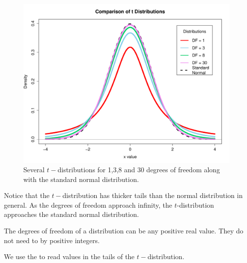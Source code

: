\begin{figure}[H]
\label{figuretdist}
\begin{center}
\includegraphics[scale=0.50]{Section4/tdistrs.pdf} 
\end{center}
\vspace*{-0.5cm}
\caption{Several $t-$distributions for 1,3,8 and 30 degrees of freedom along with the
standard normal distribution.}
\end{figure}

\noindent
Notice that the $t-$distribution has thicker tails than the normal distribution in general. As the degrees of freedom approach infinity, the $t$-distribution approaches the standard normal distribution.

\begin{nt}
The degrees of freedom of a distribution can be any positive real value. They do not need to by positive integers.
\end{nt}

We use the {\color{red}{$t-$table in Appendix ???} } to read values in the tails of the $t-$distribution.


